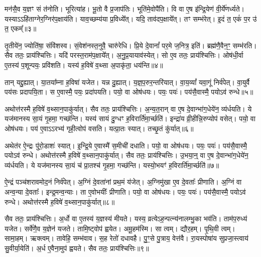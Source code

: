 मन॑सै॒व य॒ज्ञꣳ सं त॑नोति।
भूरित्या॑ह।
भू॒तो वै प्र॒जा\-प॑तिः।
भूति॑मे॒वोपै॑ति।
वि वा ए॒ष इ॑न्द्रि॒येण॑ वी॒र्ये॑णर्ध्यते।
यस्याऽऽहि॑ताग्नेर॒ग्निर॑प॒क्षाय॑ति।
याव॒च्छम्य॑या प्र॒विध्ये᳚त्।
यदि॒ ताव॑दप॒क्षाये᳚त्।
तꣳ सम्भ॑रेत्।
इ॒दं त॒ एकं॑ प॒र उ॑ त॒ एकम्᳚॥३॥

तृ॒तीये॑न॒ ज्योति॑षा॒ संवि॑शस्व।
सं॒वेश॑नस्त॒नुवै॒ चारु॑रेधि।
प्रि॒ये दे॒वानां᳚ पर॒मे ज॒नित्र॒ इति॑।
ब्रह्म॑णै॒वैन॒ꣳ॒ सम्भ॑रति।
सैव ततः॒ प्राय॑श्चित्तिः।
यदि॑ परस्त॒राम॑प॒क्षाये᳚त्।
अ॒नु॒प्र॒यायाव॑स्येत्।
सो ए॒व ततः॒ प्राय॑श्चित्तिः।
ओष॑धी॒र्वा ए॒तस्य॑ प॒शून्पयः॒ प्रवि॑शति।
यस्य॑ ह॒विषे॑ व॒थ्सा अ॒पाकृ॑ता॒ धय॑न्ति॥४॥

तान् यद्दु॒ह्यात्।
या॒तया᳚म्ना ह॒विषा॑ यजेत।
यन्न दु॒ह्यात्।
य॒ज्ञ॒प॒रुर॒न्तरि॑यात्।
वा॒य॒व्यां᳚ यवा॒गूं निर्व॑पेत्।
वा॒युर्वै पय॑सः प्रदापयि॒ता।
स ए॒वास्मै॒ पयः॒ प्रदा॑पयति।
पयो॒ वा ओष॑धयः।
पयः॒ पयः॑।
पय॑सै॒वास्मै॒ पयो\-ऽव॑ रुन्धे॥५॥

अथोत्त॑रस्मै ह॒विषे॑ व॒थ्सान॒पाकु॑र्यात्।
सैव ततः॒ प्राय॑श्चित्तिः।
अ॒न्य॒त॒रान् वा ए॒ष दे॒वान्भा॑ग॒धेये॑न॒ व्य॑र्धयति।
ये यज॑मानस्य सा॒यं गृ॒हमा॒ गच्छ॑न्ति।
यस्य॑ सायं दु॒ग्धꣳ ह॒विरार्ति॑मा॒र्च्छति॑।
इन्द्रा॑य व्री॒हीन्नि॒रुप्योप॑ वसेत्।
पयो॒ वा ओष॑धयः।
पय॑ ए॒वाऽऽरभ्य॑ गृही॒त्वोप॑ वसति।
यत्प्रा॒तः स्यात्।
तच्छृ॒तं कु॑र्यात्॥६॥

अथेत॑र ऐ॒न्द्रः पु॑रो॒डाशः॑ स्यात्।
इ॒न्द्रि॒ये ए॒वास्मै॑ स॒मीची॑ दधाति।
पयो॒ वा ओष॑धयः।
पयः॒ पयः॑।
पय॑सै॒वास्मै॒ पयो\-ऽव॑ रुन्धे।
अथोत्त॑रस्मै ह॒विषे॑ व॒थ्सान॒पाकु॑र्यात्।
सैव ततः॒ प्राय॑श्चित्तिः।
उ॒भया॒न्॒ वा ए॒ष दे॒वान्भा॑ग॒धेये॑न॒ व्य॑र्धयति।
ये यज॑मानस्य सा॒यं च॑ प्रा॒तश्च॑ गृ॒हमा॒ गच्छ॑न्ति।
यस्यो॒भयꣳ॑ ह॒विरार्ति॑मा॒र्च्छति॑॥७॥

ऐ॒न्द्रं पञ्च॑शरावमोद॒नं निर्व॑पेत्।
अ॒ग्निं दे॒वता॑नां प्रथ॒मं य॑जेत्।
अ॒ग्निमु॑खा ए॒व दे॒वताः᳚ प्रीणाति।
अ॒ग्निं वा अन्व॒न्या दे॒वताः᳚।
इन्द्र॒मन्व॒न्याः।
ता ए॒वोभयीः᳚ प्रीणाति।
पयो॒ वा ओष॑धयः।
पयः॒ पयः॑।
पय॑सै॒वास्मै॒ पयो\-ऽव॑ रुन्धे।
अथोत्त॑रस्मै ह॒विषे॑ व॒थ्सान॒पाकु॑र्यात्॥८॥

सैव ततः॒ प्राय॑श्चित्तिः।
अ॒र्धो वा ए॒तस्य॑ य॒ज्ञस्य॑ मीयते।
यस्य॒ व्रत्ये\-ऽह॒न्पत्न्य॑नालम्भु॒का भव॑ति।
ताम॑प॒रुध्य॑ यजेत।
सर्वे॑णै॒व य॒ज्ञेन॑ यजते।
तामि॒ष्ट्वोप॑ ह्वयेत।
अमू॒हम॑स्मि।
सा त्वम्।
द्यौर॒हम्।
पृ॒थि॒वी त्वम्।
सामा॒हम्।
ऋक्त्वम्।
तावेहि॒ सम्भ॑वाव।
स॒ह रेतो॑ दधावहै।
पु॒ꣳ॒से पु॒त्राय॒ वेत्त॑वै।
रा॒यस्पोषा॑य सुप्रजा॒स्त्वाय॑ सु॒वीर्या॒येति॑।
अ॒र्ध ए॒वैना॒मुप॑ ह्वयते।
सैव ततः॒ प्राय॑श्चित्तिः॥९॥\anuvakamend[द॒धा॒ति॒ य॒ज्ञ उ॑त॒ एक॒न्धय॑न्ति रुन्धे कुर्यादा॒र्च्छत्य॒पाकु॑र्यात्पृथि॒वी त्वम॒ष्टौ च॑ (सर्वा॒न्॒ वि वै यदि॑ परस्त॒रामोष॑धीरन्यत॒रानु॒भया॑न॒र्धो वै॥)]

